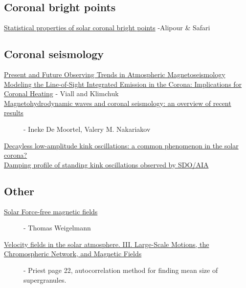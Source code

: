 \documentclass{article}
\begin{document}
\subsection{Coronal bright points}
\begin{description}
    \item [\href{http://adsabs.harvard.edu/abs/2015ApJ...807..175A}
        {Statistical properties of solar coronal bright points}
        -Alipour \& Safari]

\end{description}

\subsection{Coronal seismology}
\begin{description}
    \item [\href{http://link.springer.com/article/10.1007\%2Fs11207-007-9029-z}
        {Present and Future Observing Trends in Atmospheric Magnetoseismology}]
    \item [\href{http://arxiv.org/abs/1304.5439}
        {Modeling the Line-of-Sight Integrated Emission in the Corona:
        Implications for Coronal Heating}
        - Viall and Klimchuk]
    \item [\href{http://rsta.royalsocietypublishing.org/content/370/1970/3193}
        {Magnetohydrodynamic waves and coronal seismology: an overview of recent results}]
        - Ineke De Moortel, Valery M. Nakariakov
    \item [\href{http://arxiv.org/abs/1509.05519}
        {Decayless low-amplitude kink oscillations: a common phenomenon in the solar corona?}]
    \item [\href{http://adsabs.harvard.edu/abs/2016A\%26A...585L...6P}
        {Damping profile of standing kink oscillations observed by SDO/AIA}]
\end{description}

\subsection{Other}
\begin{description}
    \item [\href{https://arxiv.org/abs/1208.4693}
        {Solar Force-free magnetic fields}]
        - Thomas Weigelmann
    \item [\href{http://cdsads.u-strasbg.fr/abs/1964ApJ...140.1120S}
        {Velocity fields in the solar atmosphere. III.
        Large-Scale Motions, the Chromospheric Network, and Magnetic Fields}]
        - Priest
        page 22, autocorrelation method for finding mean size of supergranules.
\end{description}
\end{document}
